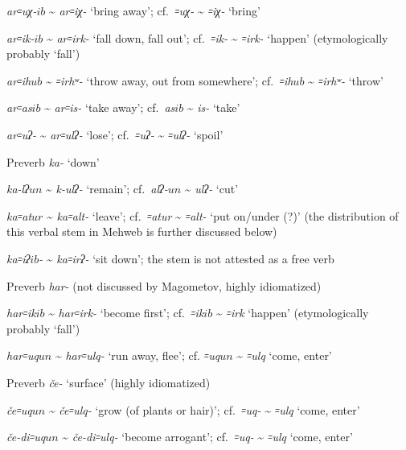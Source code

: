 \documentclass[output=paper]{langsci/langscibook}
\begin{document}
\ex %
\emph{ar꞊uχ-\(ib\)} \textasciitilde{} \emph{ar꞊iχ-} `bring
away'; cf.\ \emph{꞊uχ-} \textasciitilde{} \emph{꞊iχ-} `bring'

\ex %
\emph{ar꞊ik-\(ib\)} \textasciitilde{} \emph{ar꞊irk-} `fall
down, fall out'; cf.\ \emph{꞊ik-} \textasciitilde{} \emph{꞊irk-} `happen'
(etymologically probably `fall')

\ex %
\emph{ar꞊ih\(ub\)} \textasciitilde{} \emph{꞊irhʷ-} `throw away, out from
somewhere'; cf.\ \emph{꞊ih\(ub\)} \textasciitilde{} \emph{꞊irhʷ-} `throw'

\ex %
\emph{ar꞊as\(ib\)} \textasciitilde{} \emph{ar꞊is-} `take away'; cf.\ \emph{as\(ib\)} \textasciitilde{} \emph{is-} `take'

\ex %
\emph{ar꞊uʔ-} \textasciitilde{} \emph{ar꞊ulʔ-} `lose'; cf.\
\emph{꞊uʔ-} \textasciitilde{} \emph{꞊ulʔ-} `spoil'
\z


\ex %
Preverb \emph{ka-} `down'

\ea %
\emph{ka-lʔ\(un\)} \textasciitilde{} \emph{k-ulʔ-} `remain'; cf.\
\emph{alʔ-\(un\)} \textasciitilde{} \emph{ulʔ-} `cut'

\ex %
\emph{ka꞊at\(ur\)} \textasciitilde{} \emph{ka꞊alt-} `leave'; cf.\ \emph{꞊atur}
\textasciitilde{} \emph{꞊alt-} `put on/under (?)' (the distribution of this
verbal stem in Mehweb is further discussed below)

\ex %
\emph{ka꞊iʔ\(ib\)-} \textasciitilde{} \emph{ka꞊irʔ-} `sit down'; the stem is
not attested as a free verb
\z

\ex %
Preverb \emph{har-} (not discussed by Magometov, highly
idiomatized)

\ea %
\emph{har꞊ik\(ib\)} \textasciitilde{} \emph{har꞊irk-} `become first';
cf.\ \emph{꞊ik\(ib\)} \textasciitilde{} \emph{꞊irk} `happen'
(etymologically probably `fall')

\ex %
\emph{har꞊uq\(un\)} \textasciitilde{}
\emph{har꞊ulq-} `run away, flee'; cf. \emph{꞊uq\(un\)}
\textasciitilde{} \emph{꞊ulq} `come, enter'
\z

\ex %
Preverb \emph{če-} `surface' (highly idiomatized)

\ea %
\emph{če꞊uq\(un\)} \textasciitilde{} \emph{če꞊ulq-}
`grow (of plants or hair)'; cf.\ \emph{꞊uq-} \textasciitilde{}
\emph{꞊ulq} `come, enter'

\ex %
\emph{če-di꞊uq\(un\)} \textasciitilde{} \emph{če-di꞊ulq-}
`become arrogant'; cf.\ \emph{꞊uq-} \textasciitilde{} \emph{꞊ulq} `come,
enter'
\end{document}
